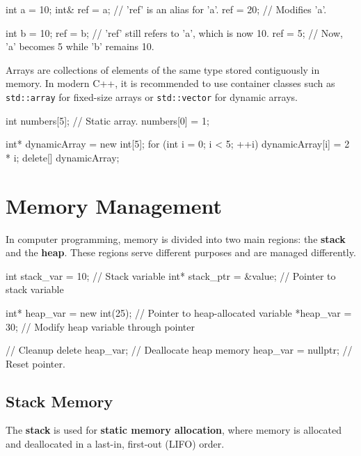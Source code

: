 \begin{codeblock}[language=C++]
int a = 10;
int& ref = a; // 'ref' is an alias for 'a'.
ref = 20;     // Modifies 'a'.

int b = 10;
ref = b;      // 'ref' still refers to 'a', which is now 10.
ref = 5;      // Now, 'a' becomes 5 while 'b' remains 10.
\end{codeblock}

Arrays are collections of elements of the same type stored contiguously in memory. In modern C++, it is recommended to use container classes such as \texttt{std::array} for fixed-size arrays or \texttt{std::vector} for dynamic arrays. 

\begin{codeblock}[language=C++]
int numbers[5]; // Static array.
numbers[0] = 1;

int* dynamicArray = new int[5];
for (int i = 0; i < 5; ++i) {
    dynamicArray[i] = 2 * i;
}
delete[] dynamicArray;
\end{codeblock}

\section{Memory Management}

In computer programming, memory is divided into two main regions: the \textbf{stack} and the \textbf{heap}. These regions serve different purposes and are managed differently.

\begin{exampleblock}
    \begin{codeblock}[language=C++]
int stack_var = 10;          // Stack variable
int* stack_ptr = &value;     // Pointer to stack variable

int* heap_var = new int(25); // Pointer to heap-allocated variable
*heap_var = 30;              // Modify heap variable through pointer

// Cleanup
delete heap_var;             // Deallocate heap memory
heap_var = nullptr;          // Reset pointer.
    \end{codeblock}
\end{exampleblock}

\subsection{Stack Memory}

The \textbf{stack} is used for \textbf{static memory allocation}, where memory is allocated and deallocated in a last-in, first-out (LIFO) order. 

